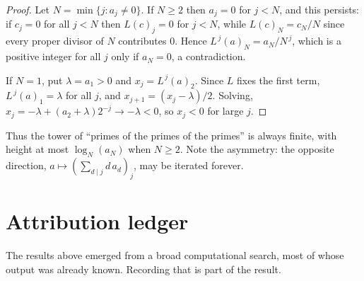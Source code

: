 \documentclass[11pt,a4paper]{article}
\theoremstyle{plain}
\theoremstyle{definition}
\theoremstyle{remark}
\begin{document}
\begin{proof}
Let $N=\min\{j: a_j\ne0\}$. If $N\ge2$ then $a_j=0$ for $j<N$, and this persists: if
$c_j=0$ for all $j<N$ then $L(c)_j=0$ for $j<N$, while $L(c)_N=c_N/N$ since every proper
divisor of $N$ contributes $0$. Hence $L^{\,j}(a)_N=a_N/N^{\,j}$, which is a positive
integer for all $j$ only if $a_N=0$, a contradiction.

If $N=1$, put $\lambda=a_1>0$ and $x_j=L^{\,j}(a)_2$. Since $L$ fixes the first term,
$L^{\,j}(a)_1=\lambda$ for all $j$, and $x_{j+1}=(x_j-\lambda)/2$. Solving,
$x_j=-\lambda+(a_2+\lambda)2^{-j}\to-\lambda<0$, so $x_j<0$ for large $j$.
\end{proof}

Thus the tower of ``primes of the primes of the primes'' is always finite, with height at
most $\log_N(a_N)$ when $N\ge2$. Note the asymmetry: the opposite direction,
$a\mapsto(\sum_{d\mid j}d\,a_d)_j$, may be iterated forever.

\section{Attribution ledger}\label{app:ledger}

The results above emerged from a broad computational search, most of whose output was
already known. Recording that is part of the result.
\end{document}
